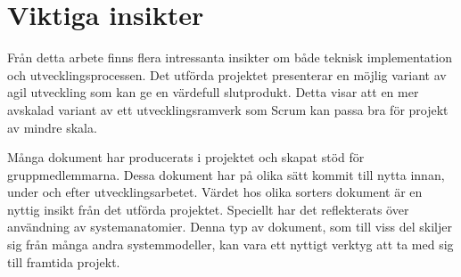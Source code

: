 \section{Viktiga insikter}

Från detta arbete finns flera intressanta insikter om både teknisk implementation och utvecklingsprocessen. Det utförda projektet presenterar en möjlig variant av agil utveckling som kan ge en värdefull slutprodukt. Detta visar att en mer avskalad variant av ett utvecklingsramverk som Scrum kan passa bra för projekt av mindre skala.

Många dokument har producerats i projektet och skapat stöd för gruppmedlemmarna. Dessa dokument har på olika sätt kommit till nytta innan, under och efter utvecklingsarbetet. Värdet hos olika sorters dokument är en nyttig insikt från det utförda projektet. Speciellt har det reflekterats över användning av systemanatomier. Denna typ av dokument, som till viss del skiljer sig från många andra systemmodeller, kan vara ett nyttigt verktyg att ta med sig till framtida projekt.

%
